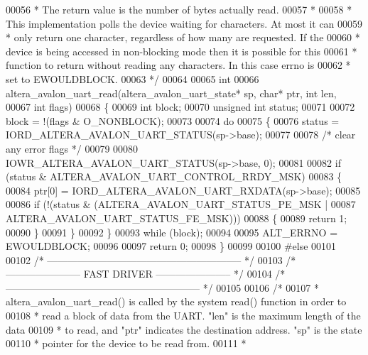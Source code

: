 \begin{DoxyCode}
00056 \textcolor{comment}{ * The return value is the number of bytes actually read.}
00057 \textcolor{comment}{ *}
00058 \textcolor{comment}{ * This implementation polls the device waiting for characters. At most it can}
00059 \textcolor{comment}{ * only return one character, regardless of how many are requested. If the }
00060 \textcolor{comment}{ * device is being accessed in non-blocking mode then it is possible for this}
00061 \textcolor{comment}{ * function to return without reading any characters. In this case errno is}
00062 \textcolor{comment}{ * set to EWOULDBLOCK.}
00063 \textcolor{comment}{ */}
00064 
00065 \textcolor{keywordtype}{int} 
00066 altera_avalon_uart_read(altera_avalon_uart_state* sp, \textcolor{keywordtype}{char}* ptr, \textcolor{keywordtype}{int} len,
00067   \textcolor{keywordtype}{int} flags)
00068 \{
00069   \textcolor{keywordtype}{int} block;
00070   \textcolor{keywordtype}{unsigned} \textcolor{keywordtype}{int} status;
00071 
00072   block = !(flags & O\_NONBLOCK);
00073 
00074   \textcolor{keywordflow}{do}
00075   \{
00076     status = IORD_ALTERA_AVALON_UART_STATUS(sp->base);
00077 
00078     \textcolor{comment}{/* clear any error flags */}
00079 
00080     IOWR_ALTERA_AVALON_UART_STATUS(sp->base, 0);
00081 
00082     \textcolor{keywordflow}{if} (status & ALTERA_AVALON_UART_CONTROL_RRDY_MSK)
00083     \{
00084       ptr[0] = IORD_ALTERA_AVALON_UART_RXDATA(sp->base);
00085 
00086       \textcolor{keywordflow}{if} (!(status & (ALTERA_AVALON_UART_STATUS_PE_MSK | 
00087       ALTERA_AVALON_UART_STATUS_FE_MSK)))
00088       \{
00089         \textcolor{keywordflow}{return} 1;
00090       \}
00091     \}
00092   \}
00093   \textcolor{keywordflow}{while} (block);
00094 
00095   ALT_ERRNO = EWOULDBLOCK;
00096  
00097   \textcolor{keywordflow}{return} 0;
00098 \}
00099 
00100 \textcolor{preprocessor}{#else}
00101 
00102 \textcolor{comment}{/* ----------------------------------------------------------- */}
00103 \textcolor{comment}{/* ----------------------- FAST DRIVER ----------------------- */}
00104 \textcolor{comment}{/* ----------------------------------------------------------- */}
00105 
00106 \textcolor{comment}{/*}
00107 \textcolor{comment}{ * altera\_avalon\_uart\_read() is called by the system read() function in order to}
00108 \textcolor{comment}{ * read a block of data from the UART. "len" is the maximum length of the data}
00109 \textcolor{comment}{ * to read, and "ptr" indicates the destination address. "sp" is the state}
00110 \textcolor{comment}{ * pointer for the device to be read from.}
00111 \textcolor{comment}{ *}

\end{DoxyCode}
